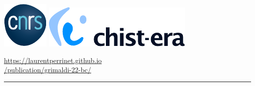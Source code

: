 \documentclass[landscape,a0]{a0poster}
\begin{document}
%
\begin{minipage}[t]{0.175\textwidth}
%
\vspace{-9cm}
\includegraphics[height=.2\textwidth]{figures/cnrs_logo.pdf}\hspace{1cm} \includegraphics[height=.2\textwidth]{figures/chistera_logo.pdf}\hspace{1cm}
\vspace{.25cm}

\begin{center}
\color{blue}
\Large
\href{https://laurentperrinet.github.io/publication/grimaldi-22-bc/}{https://laurentperrinet.github.io
\\ /publication/grimaldi-22-bc/} \end{center}
\vspace{2cm}

\end{minipage}
%
\vspace*{-1.5cm}
\hrule
\vspace{5pt}
\end{document}
